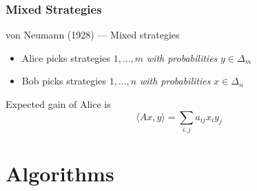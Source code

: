 \documentclass[aspectratio=149]{beamer}
\begin{document}
\begin{frame}
  \frametitle{Mixed Strategies}
  \begin{block}{von Neumann (1928) --- Mixed strategies}
    \begin{itemize}
      \item Alice picks strategies $1, \dots, m$ \emph{with probabilities} $y\in \Delta_m$
      \item Bob picks strategies $1, \dots, n$ \emph{with probabilities} $x\in \Delta_n$
    \end{itemize}
    Expected gain of Alice is
    \begin{equation}
      \langle Ax, y \rangle = \sum_{i,j} a_{ij} x_i y_j
    \end{equation}
  \end{block}
\end{frame}

\section{Algorithms}%
\label{sec:}
\end{document}
